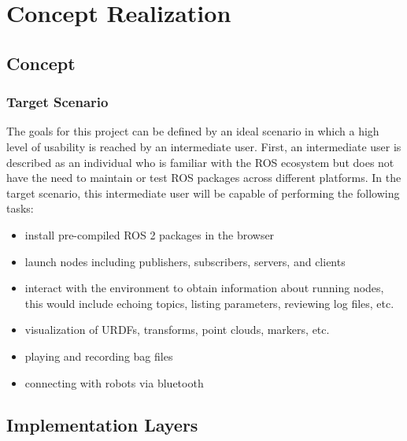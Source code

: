 \chapter{Concept Realization}\label{cha:concept}


\section{Concept}\label{sec:concept}



    \subsection{Target Scenario}

        The goals for this project can be defined by an ideal scenario in which 
        a high level of usability is reached by an intermediate user. First, an
        intermediate user is described as an individual who is familiar with the 
        ROS ecosystem but does not have the need to maintain or test ROS packages
        across different platforms. In the target scenario, this intermediate
        user will be capable of performing the following tasks:

        \begin{itemize}
            \item install pre-compiled ROS 2 packages in the browser
            \item launch nodes including publishers, subscribers, servers, and clients
            \item interact with the environment to obtain information about 
                  running nodes, this would include echoing topics, listing 
                  parameters, reviewing log files, etc.
            \item visualization of URDFs, transforms, point clouds, markers, etc.
            \item playing and recording bag files %
            \item connecting with robots via bluetooth
        \end{itemize}




\section{Implementation Layers}

